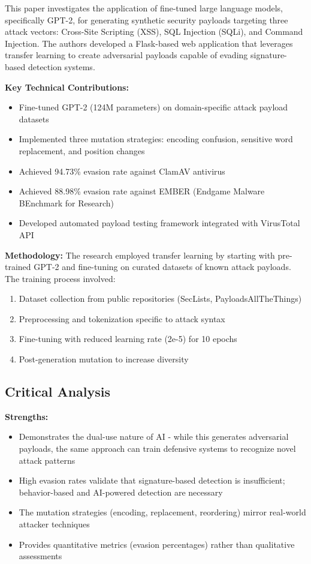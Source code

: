 \documentclass[11pt,conference]{IEEEtran}
\begin{document}
This paper investigates the application of fine-tuned large language models, specifically GPT-2, for generating synthetic security payloads targeting three attack vectors: Cross-Site Scripting (XSS), SQL Injection (SQLi), and Command Injection. The authors developed a Flask-based web application that leverages transfer learning to create adversarial payloads capable of evading signature-based detection systems.

\textbf{Key Technical Contributions:}
\begin{itemize}
    \item Fine-tuned GPT-2 (124M parameters) on domain-specific attack payload datasets
    \item Implemented three mutation strategies: encoding confusion, sensitive word replacement, and position changes
    \item Achieved 94.73\% evasion rate against ClamAV antivirus
    \item Achieved 88.98\% evasion rate against EMBER (Endgame Malware BEnchmark for Research)
    \item Developed automated payload testing framework integrated with VirusTotal API
\end{itemize}

\textbf{Methodology:}
The research employed transfer learning by starting with pre-trained GPT-2 and fine-tuning on curated datasets of known attack payloads. The training process involved:
\begin{enumerate}
    \item Dataset collection from public repositories (SecLists, PayloadsAllTheThings)
    \item Preprocessing and tokenization specific to attack syntax
    \item Fine-tuning with reduced learning rate (2e-5) for 10 epochs
    \item Post-generation mutation to increase diversity
\end{enumerate}

\subsection{Critical Analysis}

\textbf{Strengths:}
\begin{itemize}
    \item Demonstrates the dual-use nature of AI - while this generates adversarial payloads, the same approach can train defensive systems to recognize novel attack patterns
    \item High evasion rates validate that signature-based detection is insufficient; behavior-based and AI-powered detection are necessary
    \item The mutation strategies (encoding, replacement, reordering) mirror real-world attacker techniques
    \item Provides quantitative metrics (evasion percentages) rather than qualitative assessments
\end{itemize}
\end{document}
